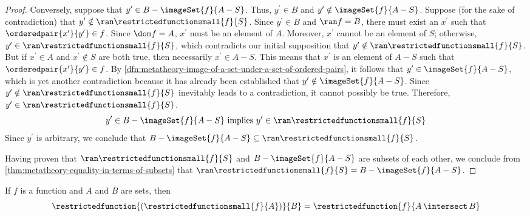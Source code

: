 \begin{proof}
    \vspace{0.3cm}
    \noindent
    Conversely, suppose that \( y^{\prime} \in B - \imageSet{f}{A - S} \).
    Thus, \( y^{\prime} \in B \) and \( y^{\prime} \notin \imageSet{f}{A - S} \).
    Suppose (for the sake of contradiction) that \( y^{\prime} \notin \ran \restrictedfunctionsmall{f}{S} \).
    Since \( y^{\prime} \in B \) and \( \ran f = B \), there must exist an \( x^{\prime} \) such that \( \orderedpair{x^{\prime}}{y^{\prime}} \in f \).
    Since \( \dom f = A \), \( x^{\prime} \) must be an element of \( A \).
    Moreover, \( x^{\prime} \) cannot be an element of \( S \); otherwise, \( y^{\prime} \in \ran \restrictedfunctionsmall{f}{S} \), which contradicts our initial supposition
    that \( y^{\prime} \notin \ran \restrictedfunctionsmall{f}{S} \).
    But if \( x^{\prime} \in A \) and \( x^{\prime} \notin S \) are both true, then necessarily \( x^{\prime} \in A - S \).
    This means that \( x^{\prime} \) is an element of \( A - S \) such that \( \orderedpair{x^{\prime}}{y^{\prime}} \in f \).
    By \cref{dfn:metatheory-image-of-a-set-under-a-set-of-ordered-pairs}, it follows that \( y^{\prime} \in \imageSet{f}{A - S} \), which is yet another contradiction
    because it has already been established that \( y^{\prime} \notin \imageSet{f}{A - S} \).
    Since \( y^{\prime} \notin \ran \restrictedfunctionsmall{f}{S} \) inevitably leads to a contradiction, it cannot possibly be true.
    Therefore, \( y^{\prime} \in \ran \restrictedfunctionsmall{f}{S} \).
    \begin{equation*}
        y^{\prime} \in B - \imageSet{f}{A - S} \ \text{implies} \ y^{\prime} \in \ran \restrictedfunctionsmall{f}{S}
    \end{equation*}
    Since \( y^{\prime} \) is arbitrary, we conclude that \( B - \imageSet{f}{A - S} \subseteq \ran \restrictedfunctionsmall{f}{S} \).

    \vspace{0.3cm}
    \noindent
    Having proven that \( \ran \restrictedfunctionsmall{f}{S} \) and \( B - \imageSet{f}{A - S} \) are subsets of each other, we conclude
    from \cref{thm:metatheory-equality-in-terms-of-subsets} that \( \ran \restrictedfunctionsmall{f}{S} = B - \imageSet{f}{A - S} \).
\end{proof}

\begin{thm}
     \label{thm:metatheory-restriction-of-restricted-function-equals-original-function-restricted-to-intersection}
    If \( f \) is a function and \( A \) and \( B \) are sets, then
    \begin{equation*}
        \restrictedfunction{ \mleft(\restrictedfunctionsmall{f}{A} \mright) }{B} = \restrictedfunction{f}{A \,{\intersect}\, B}
    \end{equation*}
\end{thm}

